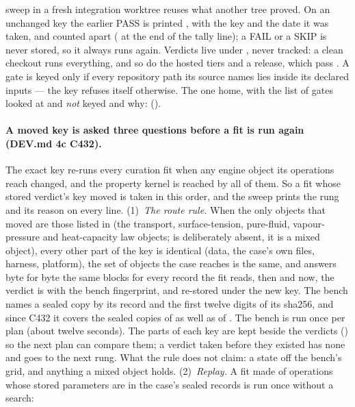 \documentclass[11pt,a4paper]{article}
\begin{document}
sweep in a fresh integration worktree reuses what another tree proved.  On an unchanged key the earlier PASS is
printed , with the key and the date it was taken, and counted
apart ( at the end of the tally line); a FAIL or a SKIP is
never stored, so it always runs again.  Verdicts live under
, never tracked: a clean checkout runs everything, and so do
the hosted tiers and a release, which pass .  A gate is keyed
only if every repository path its source names lies inside its declared
inputs --- the key refuses itself otherwise.  The one home, with the list of
gates looked at and \emph{not} keyed and why:
 ().

\paragraph{A moved key is asked three questions before a fit is run again
(DEV.md 4c C432).}  The exact key re-runs every curation fit when any engine
object its operations reach changed, and the property kernel is reached by all
of them.  So a fit whose stored verdict's key moved is taken in this order, and
the sweep prints the rung and its reason on every line.  (1)~\emph{The route
rule.}  When the only objects that moved are those listed in
 (the transport, surface-tension,
pure-fluid, vapour-pressure and heat-capacity law objects; 
is deliberately absent, it is a mixed object), every other part of the key is
identical (data, the case's own files, harness, platform), the set of objects
the case reaches is the same, and  answers
byte for byte the same blocks for every record the fit reads, then and now,
the verdict is  with the bench fingerprint, and re-stored under the
new key.  The bench names a sealed copy by its record and the first twelve
digits of its sha256, and since C432 it covers the sealed copies of
 as well as of .  The bench is run once
per plan (about twelve seconds).  The parts of each key are kept beside the
verdicts () so the next plan can compare them; a verdict taken
before they existed has none and goes to the next rung.  What the rule does not
claim: a state off the bench's grid, and anything a mixed object holds.  (2)~\emph{Replay.}  A fit made of
 operations whose stored parameters are in the case's sealed
records is run once without a search: 
\end{document}
